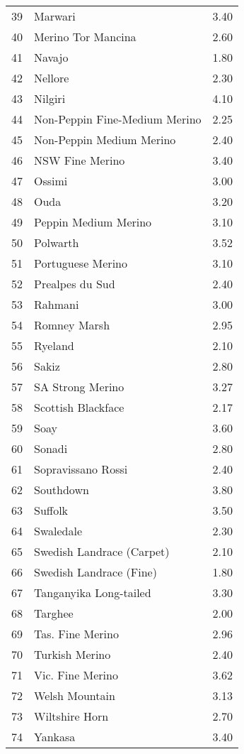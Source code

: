 \begin{center}
\begin{longtable}{|p{1.0in}|p{2.0in}|p{1.0in}|}
  39 &  Marwari & 3.40 \\ 
  40 &  Merino Tor Mancina & 2.60 \\ 
  41 &  Navajo & 1.80 \\ 
  42 &  Nellore & 2.30 \\ 
  43 &  Nilgiri & 4.10 \\ 
  44 &  Non-Peppin Fine-Medium Merino & 2.25 \\ 
  45 &  Non-Peppin Medium Merino & 2.40 \\ 
  46 &  NSW Fine Merino & 3.40 \\ 
  47 &  Ossimi & 3.00 \\ 
  48 &  Ouda & 3.20 \\ 
  49 &  Peppin Medium Merino & 3.10 \\ 
  50 &  Polwarth & 3.52 \\ 
  51 &  Portuguese Merino & 3.10 \\ 
  52 &  Prealpes du Sud & 2.40 \\ 
  53 &  Rahmani & 3.00 \\ 
  54 &  Romney Marsh & 2.95 \\ 
  55 &  Ryeland & 2.10 \\ 
  56 &  Sakiz & 2.80 \\ 
  57 &  SA Strong Merino & 3.27 \\ 
  58 &  Scottish Blackface & 2.17 \\ 
  59 &  Soay & 3.60 \\ 
  60 &  Sonadi & 2.80 \\ 
  61 &  Sopravissano Rossi & 2.40 \\ 
  62 &  Southdown & 3.80 \\ 
  63 &  Suffolk & 3.50 \\ 
  64 &  Swaledale & 2.30 \\ 
  65 &  Swedish Landrace (Carpet) & 2.10 \\ 
  66 &  Swedish Landrace (Fine) & 1.80 \\ 
  67 &  Tanganyika Long-tailed & 3.30 \\ 
  68 &  Targhee & 2.00 \\ 
  69 &  Tas. Fine Merino & 2.96 \\ 
  70 &  Turkish Merino & 2.40 \\ 
  71 &  Vic. Fine Merino & 3.62 \\ 
  72 &  Welsh Mountain & 3.13 \\ 
  73 &  Wiltshire Horn & 2.70 \\ 
  74 &  Yankasa & 3.40 \\ 
   \hline
\end{longtable}
\end{center}
